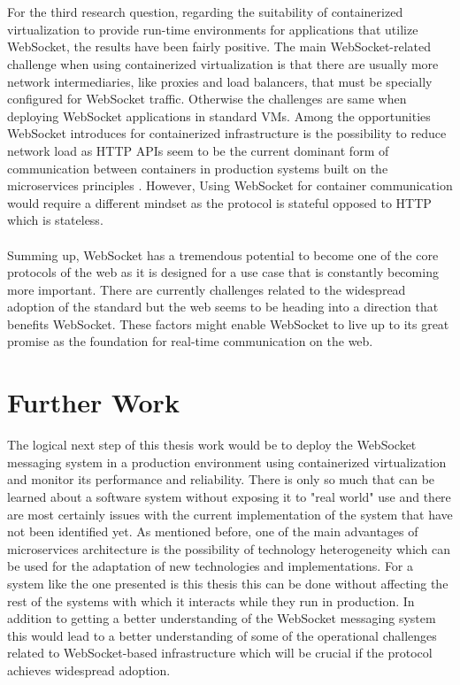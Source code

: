 \\ \\
For the third research question, regarding the suitability of containerized virtualization to provide run-time environments for applications that utilize WebSocket, the results have been fairly positive. The main WebSocket-related challenge when using containerized virtualization is that there are usually more network intermediaries, like proxies and load balancers, that must be specially configured for WebSocket traffic. Otherwise the challenges are same when deploying WebSocket applications in standard VMs. Among the opportunities WebSocket introduces for containerized infrastructure is the possibility to reduce network load as HTTP APIs seem to be the current dominant form of communication between containers in production systems built on the microservices principles \cite{fowlervMicroservices}. However, Using WebSocket for container communication would require a different mindset as the protocol is stateful opposed to HTTP which is stateless.
\\ \\
Summing up, WebSocket has a tremendous potential to become one of the core protocols of the web as it is designed for a use case that is constantly becoming more important. There are currently challenges related to the widespread adoption of the standard but the web seems to be heading into a direction that benefits WebSocket. These factors might enable WebSocket to live up to its great promise as the foundation for real-time communication on the web.

\section{Further Work}

The logical next step of this thesis work would be to deploy the WebSocket messaging system in a production environment using containerized virtualization and monitor its performance and reliability. There is only so much that can be learned about a software system without exposing it to "real world" use and there are most certainly issues with the current implementation of the system that have not been identified yet. As mentioned before, one of the main advantages of microservices architecture is the possibility of technology heterogeneity which can be used for the adaptation of new technologies and implementations. For a system like the one presented is this thesis this can be done without affecting the rest of the systems with which it interacts while they run in production. In addition to getting a better understanding of the WebSocket messaging system this would lead to a better understanding of some of the operational challenges related to WebSocket-based infrastructure which will be crucial if the protocol achieves widespread adoption. 